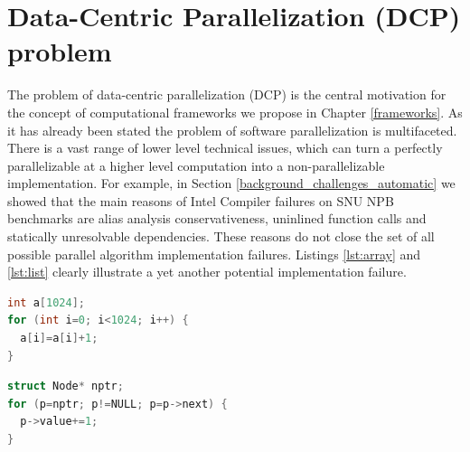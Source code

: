 \section{Data-Centric Parallelization (DCP) problem}
\label{background_dcp}
\quad The problem of data-centric parallelization (DCP) is the central motivation for the concept of computational frameworks we propose in Chapter \ref{frameworks}. As it has already been stated the problem of software parallelization is multifaceted. There is a vast range of lower level technical issues, which can turn a perfectly parallelizable at a higher level computation into a non-parallelizable implementation. For example, in Section \ref{background_challenges_automatic} we showed that the main reasons of Intel Compiler failures on SNU NPB benchmarks are alias analysis conservativeness, uninlined function calls and statically unresolvable dependencies. These reasons do not close the set of all possible parallel algorithm implementation failures. Listings \ref{lst:array} and \ref{lst:list} clearly illustrate a yet another potential implementation failure.\newline\null
\begin{minipage}[t]{0.5\linewidth}
\begin{lstlisting}[caption={\raggedright Parallelizable loop operating on what is clear to compiler a \textbf{linear array}.},label={lst:array},language=C]
int a[1024];
for (int i=0; i<1024; i++) {
  a[i]=a[i]+1;
}
\end{lstlisting}
\end{minipage}
%
\begin{minipage}[t]{0.5\linewidth}
\begin{lstlisting}[caption={\raggedright Non-parallelizable loop operating on what programmer knows is a \textbf{linked-list}.},label={lst:list},language=C]
struct Node* nptr;
for (p=nptr; p!=NULL; p=p->next) {
  p->value+=1;
}
\end{lstlisting}
\end{minipage}


